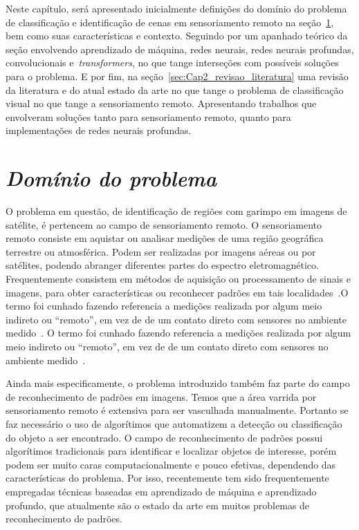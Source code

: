 Neste capítulo, será apresentado inicialmente definições do domínio do problema de
classificação e identificação de cenas em sensoriamento remoto na
seção~\ref{sec:Cap2_dominio}, bem como suas características e contexto. Seguindo por um
apanhado teórico da seção envolvendo aprendizado de máquina, redes neurais, redes neurais
profundas, convolucionais e~\textit{transformers}, no que tange interseções com possíveis
soluções para o problema.
E por fim, na seção~\ref{sec:Cap2_revisao_literatura} uma revisão da literatura e do atual
estado da arte no que tange o problema de classificação visual no que tange a
sensoriamento remoto. Apresentando trabalhos que envolveram soluções tanto para
sensoriamento remoto, quanto para implementações de redes neurais profundas.



\section{\textit{Domínio do problema}}\label{sec:Cap2_dominio}


O problema em questão, de identificação de regiões com garimpo em imagens de satélite, é
pertencem ao campo de sensoriamento remoto. O sensoriamento remoto consiste em aquistar ou
analisar medições de uma região geográfica terrestre ou atmosférica. Podem ser realizadas
por imagens aéreas ou por satélites, podendo abranger diferentes partes do espectro
eletromagnético.
Frequentemente consistem em métodos de aquisição ou processamento de sinais e imagens,
para obter características ou reconhecer padrões em tais
localidades~\cite{emery2017introduction}.O termo foi cunhado fazendo referencia a medições
realizada por algum meio indireto ou “remoto”, em vez de de um contato direto com sensores
no ambiente medido~\cite{emery2017introduction}. O termo foi cunhado fazendo referencia a
medições realizada por algum meio indireto ou “remoto”, em vez de de um contato direto com
sensores no ambiente medido~\cite{emery2017introduction}.

Ainda mais especificamente, o problema introduzido também faz parte do campo de
reconhecimento de padrões em imagens. Temos que a área varrida por sensoriamento remoto é
extensiva para ser vasculhada manualmente. Portanto se faz necessário o uso de algorítimos
que automatizem a detecção ou classificação do objeto a ser encontrado.
O campo de reconhecimento de padrões possui algorítimos tradicionais para identificar e
localizar objetos de interesse, porém podem ser muito caras computacionalmente e pouco
efetivas, dependendo das características do problema. Por isso, recentemente tem sido
frequentemente empregadas técnicas baseadas em aprendizado de máquina e aprendizado
profundo, que atualmente são o estado da arte em muitos problemas de reconhecimento de
padrões.



